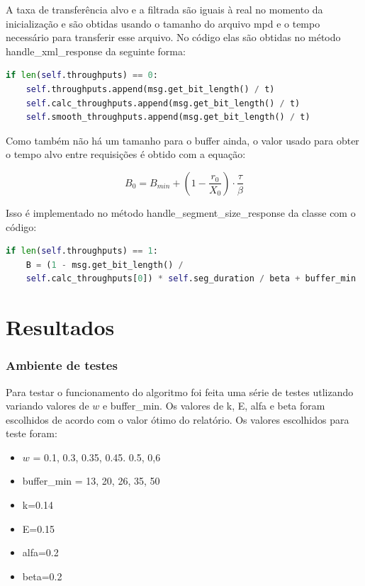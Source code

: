 \documentclass[10pt,twocolumn,letterpaper]{article}
\begin{document}
	A taxa de transferência alvo e a filtrada são iguais à real no momento da inicialização e são obtidas usando o tamanho do arquivo mpd e o tempo necessário para transferir esse arquivo. No código elas são obtidas no método handle\_xml\_response da seguinte forma:
	
	\begin{lstlisting}[language=python]
if len(self.throughputs) == 0:
	self.throughputs.append(msg.get_bit_length() / t)
	self.calc_throughputs.append(msg.get_bit_length() / t)
	self.smooth_throughputs.append(msg.get_bit_length() / t)
	\end{lstlisting}
	
	Como também não há um tamanho para o buffer ainda, o valor usado para obter o tempo alvo entre requisições é obtido com a equação:
	
	\begin{equation}
		B_0 = B_{min} + (1 - \frac{r_0}{X_0}) \cdot \frac{\tau}{\beta}
	\end{equation}
	
	Isso é implementado no método handle\_segment\_size\_response da classe com o código:
	
	\begin{lstlisting}[language=python]
if len(self.throughputs) == 1:
	B = (1 - msg.get_bit_length() /
	self.calc_throughputs[0]) * self.seg_duration / beta + buffer_min
	\end{lstlisting}
	\section{Resultados}
	\subsubsection{Ambiente de testes}
	Para testar o funcionamento do algoritmo foi feita uma série de testes utlizando variando valores de $w$ e buffer\_min. Os valores de k, E, alfa e beta foram escolhidos de acordo com o valor ótimo do relatório. Os valores escolhidos para teste foram: 
	\begin{itemize}
		\item $w$ = 0.1, 0.3, 0.35, 0.45. 0.5, 0,6
		\item buffer\_min  = 13, 20, 26, 35, 50
		\item k=0.14 
		\item E=0.15 
		\item alfa=0.2
		\item beta=0.2
	\end{itemize}
\end{document}
